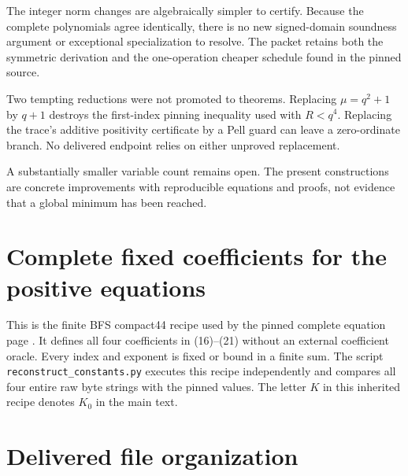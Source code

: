 The integer norm changes are algebraically simpler to certify.
Because the complete polynomials agree identically, there is no new
signed-domain soundness argument or exceptional specialization to resolve.
The packet retains both the symmetric derivation and the one-operation
cheaper schedule found in the pinned source.

Two tempting reductions were not promoted to theorems.
Replacing $\mu=q^2+1$ by $q+1$ destroys the first-index pinning inequality
used with $R<q^4$. Replacing the trace's additive positivity certificate
by a Pell guard can leave a zero-ordinate branch.
No delivered endpoint relies on either unproved replacement.

A substantially smaller variable count remains open. The present
constructions are concrete improvements with reproducible equations and
proofs, not evidence that a global minimum has been reached.

\appendix
\section{Complete fixed coefficients for the positive equations}
\label{app:constants}

This is the finite BFS compact44 recipe used by the pinned complete
equation page \cite{page}. It defines all four coefficients in (16)--(21)
without an external coefficient oracle. Every index and exponent is fixed
or bound in a finite sum. The script \texttt{reconstruct\_constants.py}
executes this recipe independently and compares all four entire raw byte
strings with the pinned values. The letter $K$ in this inherited recipe
denotes $K_0$ in the main text.

\begingroup
\small\setlength{\parskip}{4pt}

\endgroup

\clearpage
\section{Delivered file organization}

